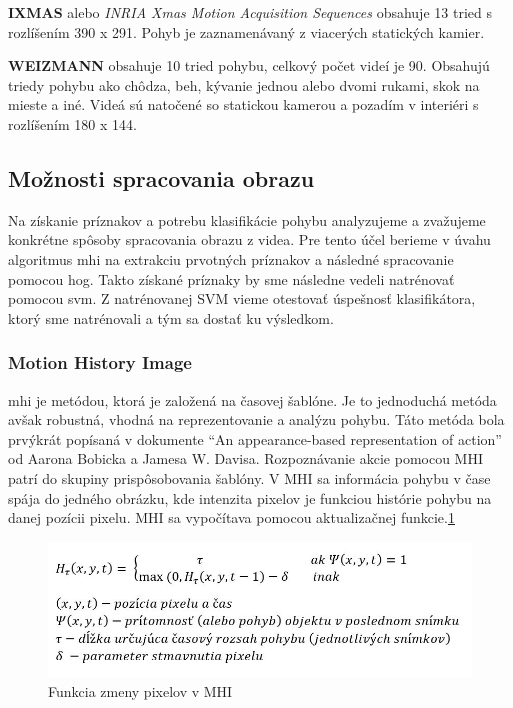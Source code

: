 \textbf{IXMAS} alebo \textit{INRIA Xmas Motion Acquisition Sequences} obsahuje 13 tried s rozlíšením 390 x 291. Pohyb je zaznamenávaný z viacerých statických kamier. \cite{c1}

\textbf{WEIZMANN} obsahuje 10 tried pohybu, celkový počet videí je 90. Obsahujú triedy pohybu ako chôdza, beh, kývanie jednou alebo dvomi rukami, skok na mieste a iné. Videá sú natočené so statickou kamerou a pozadím  v interiéri  s rozlíšením 180 x 144. \cite{c1}

\subsection{Možnosti spracovania obrazu}
Na získanie príznakov a potrebu klasifikácie pohybu analyzujeme a zvažujeme konkrétne spôsoby spracovania obrazu z videa. Pre tento účel berieme v úvahu algoritmus \acrfull{mhi} na extrakciu prvotných príznakov a následné spracovanie pomocou \acrfull{hog}. Takto získané príznaky by sme následne vedeli natrénovať pomocou \acrfull{svm}. Z natrénovanej SVM vieme otestovať úspešnosť klasifikátora, ktorý sme natrénovali a tým sa dostať ku výsledkom. 

\subsubsection{Motion History Image} \label{MHIlabel}
\acrshort{mhi} je metódou, ktorá je založená na časovej šablóne. Je to jednoduchá metóda avšak robustná, vhodná na reprezentovanie a analýzu pohybu.\cite{c3}  Táto metóda bola prvýkrát popísaná v dokumente ``An appearance-based representation of action'' od Aarona Bobicka a Jamesa W. Davisa.\cite{c2} Rozpoznávanie akcie pomocou MHI patrí do skupiny prispôsobovania šablóny. V MHI sa informácia pohybu v čase spája do jedného obrázku, kde intenzita pixelov je funkciou histórie pohybu na danej pozícii pixelu. MHI sa vypočítava pomocou aktualizačnej funkcie.\ref{MHIeq}


\begin{figure}[!htbp]
  \centering
  \includegraphics[width=14cm]{img/MHIeq.jpg}
  \caption{Funkcia zmeny pixelov v MHI}
  \label{MHIeq}
\end{figure}

